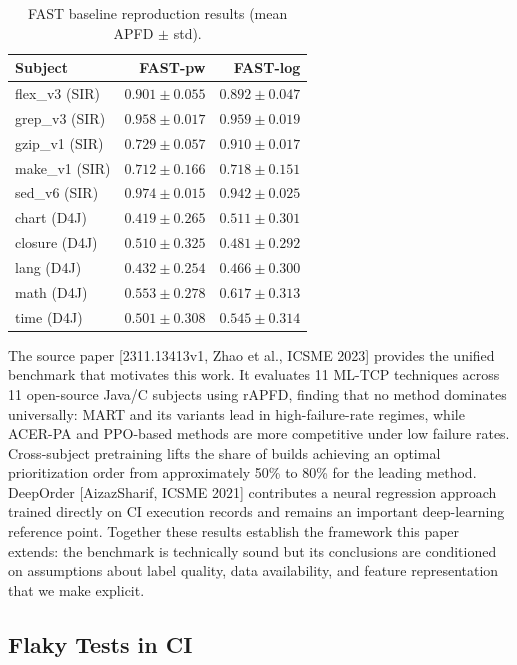 \documentclass[conference]{IEEEtran}
\begin{document}
\begin{table}[t]
\caption{FAST baseline reproduction results (mean APFD $\pm$ std).}
\label{tab:fast}
\centering
\begin{tabular}{lrr}
\toprule
\textbf{Subject} & \textbf{FAST-pw} & \textbf{FAST-log} \\
\midrule
flex\_v3 (SIR) & $0.901 {\pm} 0.055$ & $0.892 {\pm} 0.047$ \\
grep\_v3 (SIR) & $0.958 {\pm} 0.017$ & $0.959 {\pm} 0.019$ \\
gzip\_v1 (SIR) & $0.729 {\pm} 0.057$ & $0.910 {\pm} 0.017$ \\
make\_v1 (SIR) & $0.712 {\pm} 0.166$ & $0.718 {\pm} 0.151$ \\
sed\_v6 (SIR) & $0.974 {\pm} 0.015$ & $0.942 {\pm} 0.025$ \\
\midrule
chart (D4J) & $0.419 {\pm} 0.265$ & $0.511 {\pm} 0.301$ \\
closure (D4J) & $0.510 {\pm} 0.325$ & $0.481 {\pm} 0.292$ \\
lang (D4J) & $0.432 {\pm} 0.254$ & $0.466 {\pm} 0.300$ \\
math (D4J) & $0.553 {\pm} 0.278$ & $0.617 {\pm} 0.313$ \\
time (D4J) & $0.501 {\pm} 0.308$ & $0.545 {\pm} 0.314$ \\
\bottomrule
\end{tabular}
\end{table}


The source paper [2311.13413v1, Zhao et al., ICSME 2023] provides the unified benchmark that motivates this work. It evaluates 11 ML-TCP techniques across 11 open-source Java/C subjects using rAPFD, finding that no method dominates universally: MART and its variants lead in high-failure-rate regimes, while ACER-PA and PPO-based methods are more competitive under low failure rates. Cross-subject pretraining lifts the share of builds achieving an optimal prioritization order from approximately 50\% to 80\% for the leading method. DeepOrder [AizazSharif, ICSME 2021] contributes a neural regression approach trained directly on CI execution records and remains an important deep-learning reference point. Together these results establish the framework this paper extends: the benchmark is technically sound but its conclusions are conditioned on assumptions about label quality, data availability, and feature representation that we make explicit.


\subsection{Flaky Tests in CI}
\end{document}
